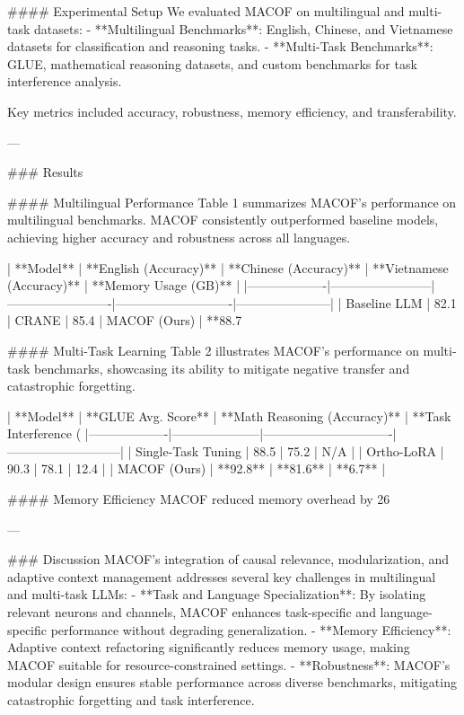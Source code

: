 #### Experimental Setup
We evaluated MACOF on multilingual and multi-task datasets:
- **Multilingual Benchmarks**: English, Chinese, and Vietnamese datasets for classification and reasoning tasks.
- **Multi-Task Benchmarks**: GLUE, mathematical reasoning datasets, and custom benchmarks for task interference analysis.

Key metrics included accuracy, robustness, memory efficiency, and transferability.

---

### Results

#### Multilingual Performance
Table 1 summarizes MACOF's performance on multilingual benchmarks. MACOF consistently outperformed baseline models, achieving higher accuracy and robustness across all languages.

| **Model**        | **English (Accuracy)** | **Chinese (Accuracy)** | **Vietnamese (Accuracy)** | **Memory Usage (GB)** |
|-------------------|------------------------|-------------------------|----------------------------|-----------------------|
| Baseline LLM      | 82.1%
| CRANE             | 85.4%
| MACOF (Ours)      | **88.7%

#### Multi-Task Learning
Table 2 illustrates MACOF's performance on multi-task benchmarks, showcasing its ability to mitigate negative transfer and catastrophic forgetting.

| **Model**        | **GLUE Avg. Score** | **Math Reasoning (Accuracy)** | **Task Interference (%
|-------------------|---------------------|-------------------------------|---------------------------|
| Single-Task Tuning | 88.5               | 75.2                          | N/A                       |
| Ortho-LoRA        | 90.3               | 78.1                          | 12.4                      |
| MACOF (Ours)      | **92.8**           | **81.6**                      | **6.7**                   |

#### Memory Efficiency
MACOF reduced memory overhead by 26%

---

### Discussion
MACOF's integration of causal relevance, modularization, and adaptive context management addresses several key challenges in multilingual and multi-task LLMs:
- **Task and Language Specialization**: By isolating relevant neurons and channels, MACOF enhances task-specific and language-specific performance without degrading generalization.
- **Memory Efficiency**: Adaptive context refactoring significantly reduces memory usage, making MACOF suitable for resource-constrained settings.
- **Robustness**: MACOF's modular design ensures stable performance across diverse benchmarks, mitigating catastrophic forgetting and task interference.


